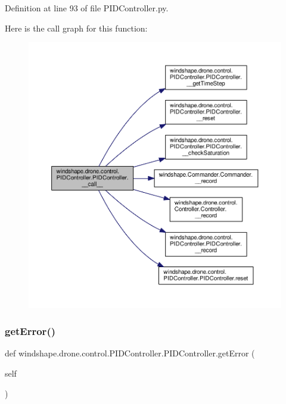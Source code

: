 Definition at line 93 of file P\+I\+D\+Controller.\+py.

Here is the call graph for this function\+:\nopagebreak
\begin{figure}[H]
\begin{center}
\leavevmode
\includegraphics[width=350pt]{classwindshape_1_1drone_1_1control_1_1_p_i_d_controller_1_1_p_i_d_controller_a932a9bc5936376c1da6f9df14f27f215_cgraph}
\end{center}
\end{figure}
\mbox{\label{classwindshape_1_1drone_1_1control_1_1_p_i_d_controller_1_1_p_i_d_controller_a558de8f7c8d2f86ad2cfe333547bfe4f}} 
\subsubsection{\texorpdfstring{get\+Error()}{getError()}}
{\footnotesize\ttfamily def windshape.\+drone.\+control.\+P\+I\+D\+Controller.\+P\+I\+D\+Controller.\+get\+Error (\begin{DoxyParamCaption}\item[{}]{self }\end{DoxyParamCaption})}

